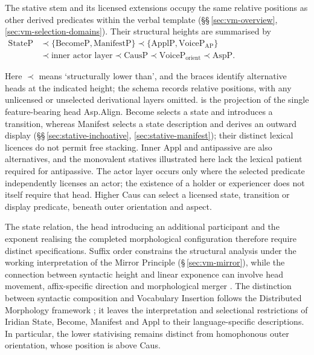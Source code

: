 \begin{samepage}
The stative stem and its licensed extensions occupy the same relative
positions as other derived predicates within the verbal template
(§§\,\ref{sec:vm-overview}, \ref{sec:vm-selection-domains}). Their
structural heights are summarised by
\ex\label{ex:stative-syntactic-hierarchy}
$\begin{aligned}
 \mathrm{StateP}
 &\prec \{\mathrm{BecomeP},\mathrm{ManifestP}\}
 \prec \{\mathrm{ApplP},\mathrm{VoiceP}_{\mathrm{AP}}\} \\
 &\prec \text{inner actor layer}
 \prec \mathrm{CausP}
 \prec \mathrm{VoiceP}_{\mathrm{orient}}
 \prec \mathrm{AspP}.
\end{aligned}$
\xe
\end{samepage}
\noindent Here $\prec$ means `structurally lower than', and the braces identify
alternative heads at the indicated height; the schema records relative
positions, with any unlicensed or unselected derivational layers omitted.
 is the projection of the single feature-bearing head
Asp.Align. Become selects a state and introduces a transition, whereas
Manifest selects a state description and derives an outward display
(§§\,\ref{sec:stative-inchoative}, \ref{sec:stative-manifest}); their
distinct lexical licences do not permit free stacking. Inner Appl and
antipassive are also alternatives, and the monovalent statives illustrated
here lack the lexical patient required for antipassive. The actor layer
occurs only where the selected predicate independently licenses an actor;
the existence of a holder or experiencer does not itself require that
head. Higher Caus can select a licensed state, transition or display
predicate, beneath outer orientation and aspect.

The state relation, the head introducing an additional participant and
the exponent realising the completed morphological configuration therefore
require distinct specifications. Suffix order constrains the structural
analysis under the working interpretation of the Mirror Principle
(§\,\ref{sec:vm-mirror}), while the connection between syntactic height
and linear exponence can involve head movement, affix-specific direction
and morphological merger \cite{harley2011}. The distinction between
syntactic composition and Vocabulary Insertion follows the Distributed
Morphology framework \cite{embicknoyer2007}; it leaves the interpretation
and selectional restrictions of Iridian State, Become, Manifest and Appl
to their language-specific descriptions. In particular, the lower
stativising  remains distinct from homophonous outer orientation,
whose position is above Caus.

